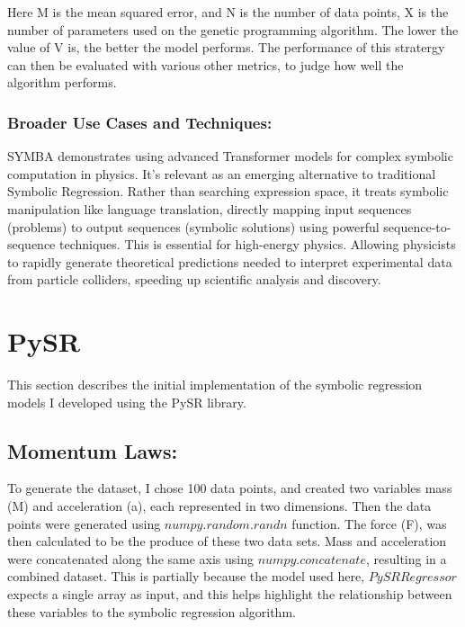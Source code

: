 \documentclass{article}
\begin{document}
Here M is the mean squared error, and N is the number of data points, X is the number of parameters used on the genetic programming algorithm. The lower the value of V is, the better the model performs. The performance of this stratergy can then be evaluated with various other metrics, to judge how well the algorithm performs. \\ 


\subsubsection{Broader Use Cases and Techniques: }

SYMBA \cite{Alnuqaydan2023}demonstrates using advanced Transformer models for complex symbolic computation in physics. It's relevant as an emerging alternative to traditional Symbolic Regression. Rather than searching expression space, it treats symbolic manipulation like language translation, directly mapping input sequences (problems) to output sequences (symbolic solutions) using powerful sequence-to-sequence techniques. This is essential for high-energy physics. Allowing  physicists to rapidly generate theoretical predictions needed to interpret experimental data from particle colliders, speeding up scientific analysis and discovery.\\



\section{PySR}

This section describes the initial implementation of the symbolic regression models I developed using the PySR library.\\

\subsection{Momentum Laws: }

To generate the dataset, I chose 100 data points, and created two variables mass (M) and acceleration (a), each represented in two dimensions\cite{cranmer2023}. Then the data points were generated using $numpy.random.randn$ function. The force (F), was then calculated to be the produce of these two data sets. Mass and acceleration were concatenated along the same axis using $numpy.concatenate$, resulting in a combined dataset. This is partially because the model used here, $PySRRegressor$ expects a single array as input, and this helps highlight the relationship between these variables to the symbolic regression algorithm.\\ 
\end{document}
